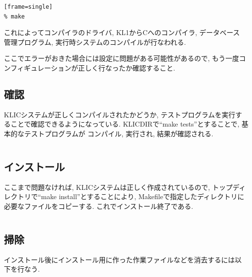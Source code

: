 \documentclass[a4,titlepage]{jsreport}
\begin{document}
\begin{verbatim}[frame=single]
% make
\end{verbatim}

これによってコンパイラのドライバ, KL1からCへのコンパイラ, データベース
管理プログラム, 実行時システムのコンパイルが行なわれる.

ここでエラーがおきた場合には設定に問題がある可能性があるので, 
もう一度コンフィギュレーションが正しく行なったか確認すること.  

\subsection{確認}
KLICシステムが正しくコンパイルされたかどうか, 
テストプログラムを実行することで確認できるようになっている.  
KLICDIRで``make tests''とすることで, 基本的なテストプログラムが
コンパイル, 実行され, 結果が確認される.  

\begin{Verbatim}[frame=single]
% make tests
\end{Verbatim}

\subsection{インストール}
ここまで問題なければ, KLICシステムは正しく作成されているので, 
トップディレクトリで``make install''とすることにより, 
Makefileで指定したディレクトリに必要なファイルをコピーする.  
これでインストール終了である.  

\begin{Verbatim}[frame=single]
% make install
\end{Verbatim}

\subsection{掃除}

インストール後にインストール用に作った作業ファイルなどを消去するには以
下を行なう.

\begin{Verbatim}[frame=single]
% make distclean
\end{Verbatim}
\end{document}
